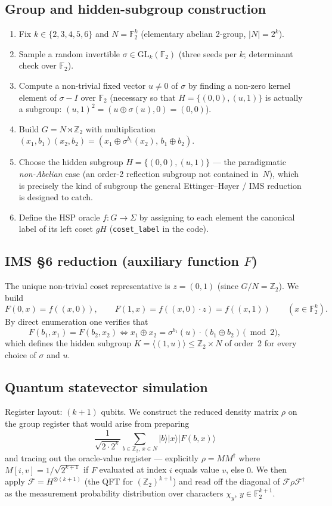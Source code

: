 \documentclass[11pt]{article}
\begin{document}
\subsection{Group and hidden-subgroup construction}
\begin{enumerate}
  \item Fix $k\in\{2,3,4,5,6\}$ and $N=\mathbb{F}_2^k$ (elementary abelian
        2-group, $|N|=2^k$).
  \item Sample a random invertible $\sigma\in\mathrm{GL}_k(\mathbb{F}_2)$
        (three seeds per $k$; determinant check over $\mathbb{F}_2$).
  \item Compute a non-trivial fixed vector $u\ne 0$ of $\sigma$
        by finding a non-zero kernel element of $\sigma-I$ over
        $\mathbb{F}_2$ (necessary so that $H=\{(0,0),(u,1)\}$ is actually a
        subgroup: $(u,1)^2 = (u\oplus \sigma(u),0) = (0,0)$).
  \item Build $G=N\rtimes\mathbb{Z}_2$ with multiplication
        $(x_1,b_1)(x_2,b_2)=(x_1\oplus\sigma^{b_1}(x_2),\,b_1\oplus b_2)$.
  \item Choose the hidden subgroup $H=\{(0,0),(u,1)\}$ — the paradigmatic
        \emph{non-Abelian} case (an order-2 reflection subgroup not contained
        in~$N$), which is precisely the kind of subgroup the general
        Ettinger--H\o yer / IMS reduction is designed to catch.
  \item Define the HSP oracle $f\colon G\to \Sigma$ by assigning to each
        element the canonical label of its left coset $gH$
        (\texttt{coset\_label} in the code).
\end{enumerate}

\subsection{IMS \S6 reduction (auxiliary function $F$)}
The unique non-trivial coset representative is $z=(0,1)$ (since
$G/N=\mathbb{Z}_2$).  We build
\[
   F(0,x) = f((x,0)),\qquad F(1,x) = f((x,0)\cdot z) = f((x,1))
   \qquad (x\in\mathbb{F}_2^k).
\]
By direct enumeration one verifies that
\[
  F(b_1,x_1)=F(b_2,x_2)
  \iff x_1\oplus x_2 = \sigma^{b_1}(u)\cdot(b_1\oplus b_2)\,
  \bigl(\bmod 2\bigr),
\]
which defines the hidden subgroup $K=\langle (1,u)\rangle\le
\mathbb{Z}_2\times N$ of order~2 for every choice of $\sigma$ and $u$.

\subsection{Quantum statevector simulation}
Register layout: $(k{+}1)$ qubits.  We construct the reduced density matrix
$\rho$ on the group register that would arise from preparing
\[
   \frac{1}{\sqrt{2\cdot 2^k}}\sum_{b\in\mathbb{Z}_2,\,x\in N}
      |b\rangle|x\rangle|F(b,x)\rangle
\]
and tracing out the oracle-value register — explicitly $\rho = MM^\dagger$
where $M[i,v]=1/\sqrt{2^{k+1}}$ if $F$ evaluated at index $i$ equals value
$v$, else $0$.  We then apply
$\mathcal{F} = H^{\otimes (k+1)}$ (the QFT for $(\mathbb{Z}_2)^{k+1}$) and
read off the diagonal of $\mathcal{F}\rho\mathcal{F}^\dagger$ as the
measurement probability distribution over characters
$\chi_y$, $y\in\mathbb{F}_2^{k+1}$.
\end{document}
